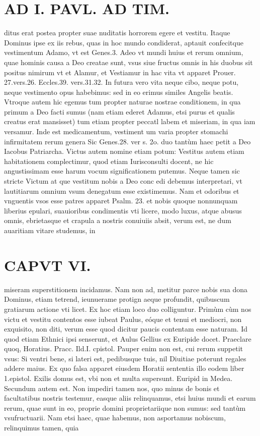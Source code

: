 \documentclass{article}
\begin{document}
\begin{pages}
\section*{AD I. PAVL. AD TIM. }
\marginpar{[ p.130 ]}\pstart ditus erat postea propter suae nuditatis horrorem egere et vestitu. Itaque Dominus ipse ex iis rebus, quas in hoc mundo condiderat, aptauit confecitque vestimentum Adamo, vt est Genes.3. Adeo vt mundi huius et rerum omnium, quae hominis causa a Deo creatae sunt, vsus siue fructus omnis in his duobus sit positus nimirum vt et Alamur, et Vestiamur in hac vita vt apparet Prouer. 27.vers.26. Eccles.39. vers.31.32. In futura vero vita neque cibo, neque potu, neque vestimento opus habebimus: sed in eo erimus similes Angelis beatis. Vtroque autem hic egemus tum propter naturae nostrae conditionem, in qua primum a Deo facti sumus (nam etiam ederet Adamus, etsi purus et qualis creatus erat mansisset) tum etiam propter peccatl labem et miseriam, in qua iam versamur. Inde est medicamentum, vestiment um varia propter stomachi infirmitatem rerum genera Sic Genes.28. ver s. 2o. duo tantùm haec petit a Deo Iacobus Patriarcha.  \pend\pstart Victus autem nomine etiam potum: Vestitus autem etiam habitationem complectimur, quod etiam Iurisconsulti docent, ne hic angustissimam esse harum vocum significationem putemus. Neque tamen sic stricte Victum at que vestitum nobis a Deo conc edi debemus interpretari, vt lautitiarum omnium vsum denegatum esse existimemus. Nam et odoribus et vnguentis vsos esse patres apparet Psalm. 23. et nobis quoque nonnunquam liberius epulari, suauioribus condimentis vti licere, modo luxus, atque abusus omnis, ebrietasque et crapula a nostris conuiuiis absit, verum est, ne dum auaritiam vitare studemus, in  \pend
\section*{CAPVT VI. }
\marginpar{[ p.439 ]}\pstart miseram superstitionem incidamus. Nam non ad, metitur parce nobis sua dona Dominus, etiam tetrend, ieunuerame protign aeque profundit, quibuscum gratiarum actione vti licet.  \pend\pstart Ex hoc etiam loco duo colliguntur. Primùm cùm nos victu et vestitu contentos esse iubeat Paulus, eóque et tenui et mediocri, non exquisito, non diti, verum esse quod dicitur paucis contentam esse naturam. Id quod etiam Ethnici ipsi senserunt, et Aulus Gellius ex Euripide docet. Praeclare quoq, Horatius. Pracc. Ild.I. cpistol. Pauper enim non est, cui rerum suppetit vsus: Si ventri bene, si lateri est, pedibusque tuis, nil Diuitiae poterunt regales addere maius.  \pend\pstart Ex quo falsa apparet eiusdem Horatii sententia illo eodem liber 1.epistol.  \pend\pstart Exilis domus est, vbi non et multa supersunt. Euripid in Medea.  \pend\pstart Secundum autem est. Non impediri tamen nos, quo minus de bonis et facultatibus nostris testemur, easque aliis relinquamus, etsi huius mundi et earum rerum, quae sunt in eo, proprie domini proprietariique non sumus: sed tantùm vsufructuarii. Nam etsi haec, quae habemus, non asportamus nobiscum, relinquimus tamen, quia  \pend

\end{pages}
\end{document}
